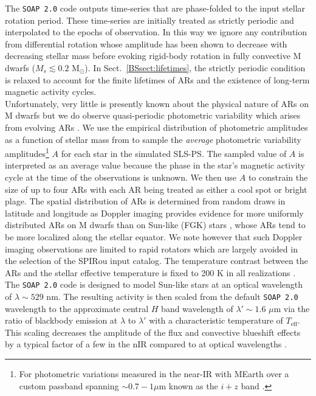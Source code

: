The \texttt{SOAP 2.0} code outputs time-series that are phase-folded to the input 
stellar rotation period. These time-series are initially treated as strictly periodic
and interpolated to the epochs of observation. In
this way we ignore any contribution from differential rotation whose amplitude has been shown to
decrease with decreasing stellar mass \citep{donati08, morin08, kitchatinov11}
before evoking rigid-body rotation in fully convective M dwarfs
($M_s \lesssim 0.2$ M$_{\odot}$). In Sect.~\ref{BSsect:lifetimes},
the strictly periodic condition is relaxed to account for the finite lifetimes of ARs and the existence of
long-term magnetic activity cycles. \\

Unfortunately, very little is presently known about the physical nature of ARs on M dwarfs but we do observe
quasi-periodic photometric variability which arises from evolving ARs \citep{oneal05}. We use the
empirical distribution of photometric amplitudes as a function of stellar mass from \cite{newton16a} to sample
the \emph{average} photometric variability amplitudes\footnote{For photometric variations measured in the near-IR
  with MEarth over a custom passband spanning $\sim 0.7-1 \mu$m known as the $i+z$ band \citep{nutzman08}.}
$A$ for each star in the simulated SLS-PS. The sampled value of $A$ is interpreted as an
average value because the phase in the star's magnetic activity cycle at the time of the \cite{newton16a}
observations is unknown. We then use $A$ to constrain the size of up to four ARs with each AR being treated as either
a cool spot or bright plage. The spatial distribution of
ARs is determined from random draws in latitude and longitude as  
Doppler imaging provides evidence for more uniformly distributed ARs on M dwarfs than on
Sun-like (FGK) stars \citep{barnes01, barnes04}, whose ARs tend to be more localized along the
stellar equator. We note however that such Doppler imaging observations are limited to rapid rotators
which are largely avoided in the selection of the SPIRou input catalog. 
The temperature contrast between the ARs and the stellar effective
temperature is fixed to 200 K in all realizations \citep{berdyugina05}. The \texttt{SOAP 2.0} code is
designed to model Sun-like stars at an optical wavelength of $\lambda \sim 529$ nm.
The resulting activity is then scaled from the default \texttt{SOAP 2.0} wavelength to the approximate
central $H$ band wavelength of $\lambda' \sim 1.6$ $\mu$m via the ratio of blackbody emission at $\lambda$ to $\lambda'$
with a characteristic temperature of $T_{\text{eff}}$. 
This scaling decreases the amplitude of the flux and convective blueshift effects by a typical
factor of a few in the nIR compared to at optical wavelengths
\citep{martin06, huelamo08, prato08, reiners10, mahmud11}.


